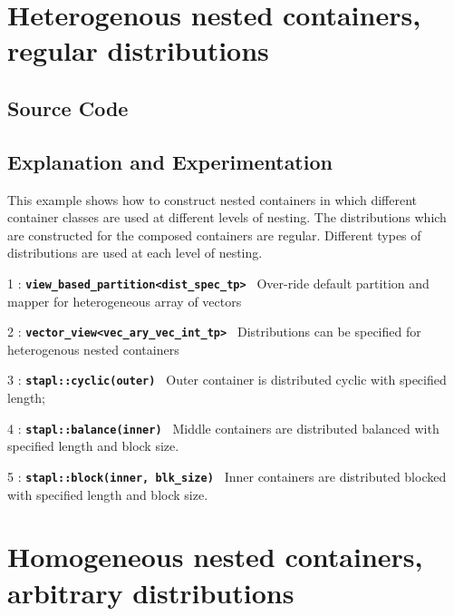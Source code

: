 \documentclass{report}
\begin{document}
\pagebreak
\section{Heterogenous nested containers, regular distributions}

\subsection{Source Code}



\subsection{Explanation and Experimentation}

This example shows how to construct nested containers in which different
container classes are used at different levels of nesting.  The distributions
which are constructed for the composed containers are regular.
Different types of distributions are used at each level of nesting.

\begin{hashitemize}
\item 1 : \texttt{{\bf view\_based\_partition<dist\_spec\_tp> }}
\newline
Over-ride default partition and mapper for heterogeneous array of vectors
\item 2 : \texttt{{\bf vector\_view<vec\_ary\_vec\_int\_tp> }}
\newline
Distributions can be specified for heterogenous nested containers
\item 3 : \texttt{{\bf stapl::cyclic(outer) }}
\newline
Outer container is distributed cyclic with specified length;
\item 4 : \texttt{{\bf stapl::balance(inner) }}
\newline
Middle containers are distributed balanced with specified length and block size.
\item 5 : \texttt{{\bf stapl::block(inner, blk\_size) }}
\newline
Inner containers are distributed blocked with specified length and block size.
\end{hashitemize}


\pagebreak
\section{ Homogeneous nested containers, arbitrary distributions }
\end{document}

